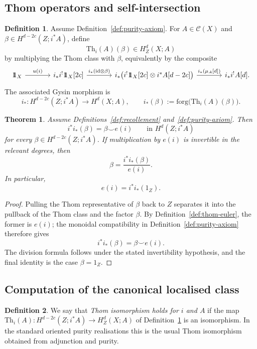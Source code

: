 \documentclass[10pt,a4paper,dvipsnames,x11names]{amsart}
\newcommand{\one}{1\hskip-3.5pt1}
\newcommand{\C}{\mathcal C}
\newcommand{\id}{\mathrm{id}}
\newcommand{\forg}{\mathrm{forg}}
\newcommand{\Th}{\mathrm{Th}}
\numberwithin{equation}{section}
\theoremstyle{plain}
\newtheorem{theorem}{Theorem}[section]
\theoremstyle{definition}
\newtheorem{definition}[definition]{Definition}
\theoremstyle{remark}
\begin{document}
\subsection{Thom operators and self-intersection}

\begin{definition}\label{def:Th-operator}
Assume Definition~\ref{def:purity-axiom}.  For $A\in\C(X)$ and $\beta\in H^{d-2c}(Z;i^*A)$, define
\[
\Th_i(A)(\beta)\in H_Z^d(X;A)
\]
by multiplying the Thom class with $\beta$, equivalently by the composite
\[
\begin{tikzcd}[column sep=large]
\one_X
\arrow[r, "u(i)"] &
i_*i^!\one_X[2c]
\arrow[r, "{i_*(\id\otimes\beta)}"] &
i_*\bigl(i^!\one_X[2c]\otimes i^*A[d-2c]\bigr)
\arrow[r, "{i_*(\mu_A[d])}"] &
i_*i^!A[d].
\end{tikzcd}
\]
The associated Gysin morphism is
\[
i_*:H^{d-2c}(Z;i^*A)\longrightarrow H^d(X;A),
\qquad
i_*(\beta):=\forg\bigl(\Th_i(A)(\beta)\bigr).
\]
\end{definition}

\begin{theorem}\label{thm:self-int}
Assume Definitions~\ref{def:recollement} and~\ref{def:purity-axiom}.  Then
\[
i^*i_*(\beta)=\beta\smile e(i)
\qquad\text{in }H^d(Z;i^*A)
\]
for every $\beta\in H^{d-2c}(Z;i^*A)$.  If multiplication by $e(i)$ is invertible in the relevant degrees, then
\[
\beta=\frac{i^*i_*(\beta)}{e(i)}.
\]
In particular,
\[
e(i)=i^*i_*(1_Z).
\]
\end{theorem}

\begin{proof}
Pulling the Thom representative of $\beta$ back to $Z$ separates it into the pullback of the Thom class and the factor $\beta$.  By Definition~\ref{def:thom-euler}, the former is $e(i)$; the monoidal compatibility in Definition~\ref{def:purity-axiom} therefore gives
\[
i^*i_*(\beta)=\beta\smile e(i).
\]
The division formula follows under the stated invertibility hypothesis, and the final identity is the case $\beta=1_Z$.
\end{proof}

\subsection{Computation of the canonical localised class}

\begin{definition} \label{def:Thom-iso}
We say that \emph{Thom isomorphism holds for $i$ and $A$} if the map
$
\Th_i(A):H^{d-2c}(Z;i^*A)\to H_Z^d(X;A)
$
of Definition~\ref{def:Th-operator} is an isomorphism.  In the standard oriented purity realisations this is the usual Thom isomorphism obtained from adjunction and purity.
\end{definition}
\end{document}
